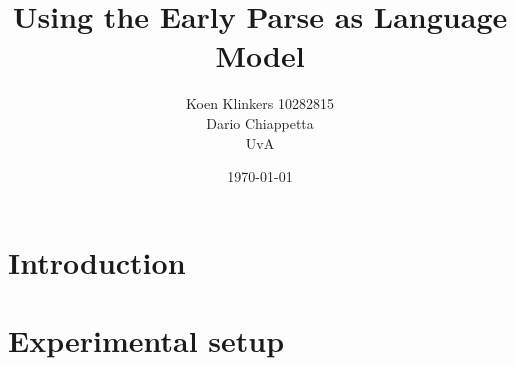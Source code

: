 \documentclass[11pt,a4paper]{article}
\begin{document}
\title{Using the Early Parse as Language Model}
\author{Koen Klinkers 10282815\\Dario Chiappetta\\UvA}
\date{\today}

\maketitle


\section{Introduction}



\section{Experimental setup}
\end{document}
